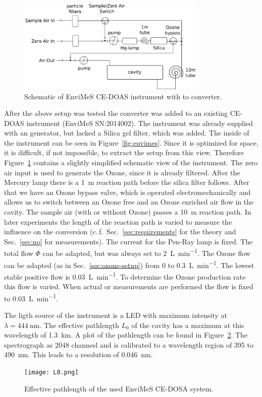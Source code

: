 \begin{figure}[htbp]
  \centering
  \includegraphics[width=0.8\textwidth]{images/envimes_setup.png}
  \caption{Schematic of EnviMeS CE-DOAS instrument with  to
     converter.}
  \label{fig:envimes-schematic}
\end{figure}

After the above setup was tested the converter was added to an
existing CE-DOAS instrument (EnviMeS SN:2014002).  The instrument was
already supplied with an  generator, but lacked a Silica gel
filter, which was added. The inside of the instrument can be seen in
Figure~\ref{fig:envimes}. Since it is optimized for space, it is
difficult, if not impossible, to extract the setup from this
view. Therefore Figure~\ref{fig:envimes-schematic} contains a slightly
simplified schematic view of the instrument. The zero air input is
used to generate the Ozone, since it is already filtered. After the
Mercury lamp there is a \SI{1}{\meter} reaction path before the silica
filter follows. After that we have an Ozone bypass valve, which is
operated electromechanically and allows us to switch between an Ozone
free and an Ozone enriched air flow in the cavity. The sample air
(with or without Ozone) passes a \SI{10}{\meter} reaction path. In
later experiments the length of the reaction path is varied to measure
the influence on the  conversion (c.\,f.\
Sec.~\ref{sec:requirements} for the theory and Sec.~\ref{sec:no} for
measurements). The current for the Pen-Ray lamp is fixed. The total
flow $\Phi$ can be adapted, but was always set to
\SI{2}{\liter\per\minute}. The Ozone flow can be adapted (as in
Sec.~\ref{sec:ozone-setup}) from 0 to \SI{0.3}{\liter\per\minute}. The
lowest stable positive flow is \SI{0.03}{\liter\per\minute}. To
determine the Ozone production rate this flow is varied. When actual
\ch{NO} or \ch{NO_x}\todo{define NOx somewhere} measurements are
performed the flow is fixed to \SI{0.03}{\liter\per\minute}.

The ligth source of the instrument is a LED with maximum intensity at
$\lambda = \SI{444}{\nano\meter}$. The effective pathlength $L_0$ of
the cavity has a maximum at this wavelength of
\SI{1.3}{\kilo\meter}. A plot of the pathlength can be found in
Figure~\ref{fig:pathlength}. The spectrograph as \num{2048} channesl
and is calibrated to a wavelength region of \num{395} to
\SI{490}{\nano\meter}. This leads to a resolution of
\SI{0.046}{\nano\meter}.

\begin{figure}[htbp]
  \centering
  \texttt{[image: L0.png]}
  \caption{Effective pathlength of the used EnviMeS CE-DOSA system.}
  \label{fig:pathlength}
\end{figure}

